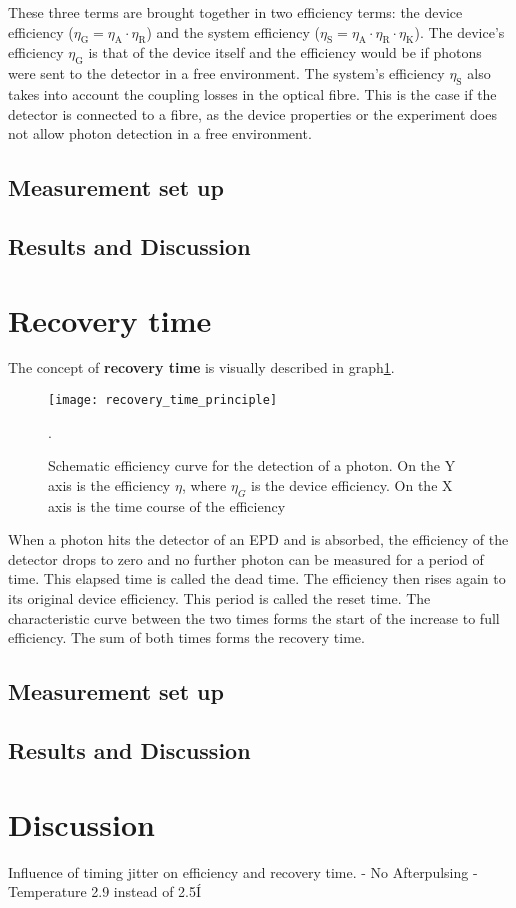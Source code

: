 These three terms are brought together in two efficiency terms: the device efficiency
($\eta_{\text{G}} = \eta_{\text{A}} \cdot \eta_{\text{R}}$) and the system efficiency
($\eta_{\text{S}} = \eta_{\text{A}} \cdot \eta_{\text{R}} \cdot \eta_{\text{K}}$).
The device's efficiency $\eta_{\text{G}}$ is that of the device itself and the efficiency would be if photons were sent
to the detector in a free environment.
The system's efficiency $\eta_{\text{S}}$ also takes into account the coupling losses in the optical fibre.
This is the case if the detector is connected to a fibre, as the device properties or the experiment does not allow
photon detection in a free environment.\\

\subsection*{Measurement set up}
\subsection*{Results and Discussion}
\section{Recovery time}
The concept of \textbf{recovery time} is visually described in graph\ref{fig:Recovery_time}. \\
\begin{figure}[hhh]
\texttt{[image: recovery\_time\_principle]}
\caption{Schematic efficiency curve for the detection of a photon\cite{shalm_single-photon_2013}. On the Y axis is the
efficiency $\eta$, where $\eta_{G}$ is the device efficiency. On the X axis is the time course of the efficiency}.
\label{fig:Recovery_time}
\end{figure}

When a photon hits the detector of an EPD and is absorbed, the efficiency of the detector drops to zero and no further
photon can be measured for a period of time.
This elapsed time is called the dead time.
The efficiency then rises again to its original device efficiency.
This period is called the reset time.
The characteristic curve between the two times forms the start of the increase to full efficiency.
The sum of both times forms the recovery time.

\subsection*{Measurement set up}

\subsection*{Results and Discussion}
\section{Discussion}
Influence of timing jitter on efficiency and recovery time.
- No Afterpulsing
- Temperature 2.9 instead of 2.5Í